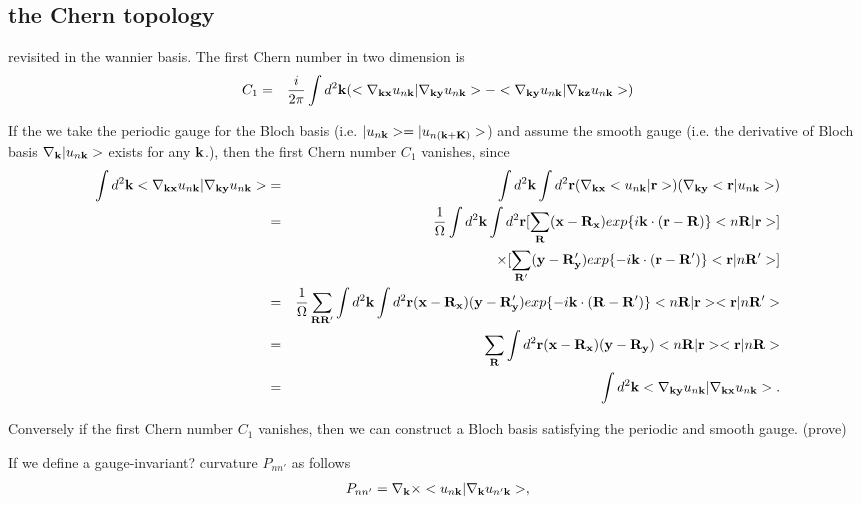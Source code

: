 \documentclass[aps,prb,preprint]{revtex4-1}
\begin{document}
\begin{appendix}
\section{the Chern topology}
revisited in the wannier basis. The first Chern number in two dimension is 
\begin{eqnarray}
C_1 %
&=& \frac{i}{2\pi} \int d^2{\bf k} (<\nabla_{\bf kx}u_{n{\bf k}}|\nabla_{\bf ky}u_{n{\bf k}}> - <\nabla_{\bf ky}u_{n{\bf k}}|\nabla_{\bf kz}u_{n{\bf k}}> )\nonumber \\ 
\end{eqnarray} 

If the we take the periodic gauge for the Bloch basis (i.e. $|u_{n{\bf k}}>=|u_{n({\bf k+K})}>$) and assume the smooth gauge (i.e. the derivative of Bloch basis $\nabla_{\bf k}|u_{n{\bf k}}>$ exists for any ${\bf k}$.), then the first Chern number $C_1$ vanishes, since
\begin{eqnarray}
\int d^2{\bf k} <\nabla_{\bf kx}u_{n{\bf k}}|\nabla_{\bf ky}u_{n{\bf k}}> &=&\int d^2{\bf k} \int d^2{\bf r}  (\nabla_{\bf kx}<u_{n{\bf k}}|{\bf r}>)(\nabla_{\bf ky}<{\bf r}|u_{n{\bf k}}>)\nonumber \\ 
&=&\frac{1}{\Omega} \int d^2{\bf k} \int d^2{\bf r} [ \sum_{\bf R} ({\bf x-R_x}) exp\{i{\bf k} \cdot ({\bf r-R} )\}<n{\bf R}|{\bf r}> ] \nonumber \\ 
&& \times [\sum_{\bf R'} ({\bf y-R'_y}) exp\{-i{\bf k} \cdot ({\bf r- R'} )\}< {\bf r} |n{\bf R'}>] \nonumber \\ 
&=& \frac{1}{\Omega} \sum_{\bf RR'} \int d^2{\bf k} \int d^2{\bf r} ({\bf x-R_x})({\bf y-R'_y}) exp\{- i{\bf k} \cdot ({\bf R-R'} )\} <n{\bf R}|{\bf r}>< {\bf r} |n{\bf R'}> \nonumber \\ 
&=& \sum_{\bf R} \int d^2{\bf r} ({\bf x-R_x})({\bf y-R_y}) <n{\bf R}|{\bf r}>< {\bf r} |n{\bf R}> \nonumber \\ 
&=& \int d^2{\bf k} <\nabla_{\bf ky}u_{n{\bf k}}|\nabla_{\bf kx}u_{n{\bf k}}>.
\end{eqnarray} 

Conversely if the first Chern number $C_1$ vanishes, then we can construct a Bloch basis satisfying the periodic and smooth gauge.
(prove)

If we define a gauge-invariant? curvature $P_{nn'}$ as follows
\begin{eqnarray}
P_{nn'} = \nabla_{\bf k} \times <u_{n{\bf k}}|\nabla_{\bf k}u_{n'{\bf k}}>, 
\end{eqnarray} 



\end{appendix}
\end{document}
